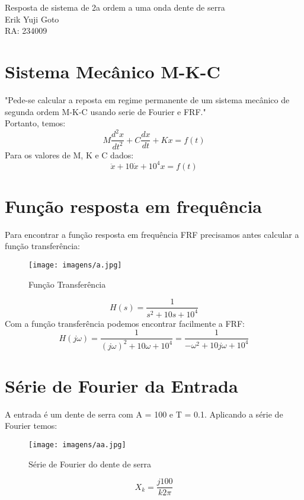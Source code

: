 \documentclass[a4paper, 12pt]{article}
\begin{document}
	\begin{center} %
		{\Large Resposta de sistema de 2a ordem a uma onda dente de serra}\\[0.4cm]
		{\large Erik Yuji Goto}\\[0.2cm]
		{\normalsize RA: 234009}
	\end{center} %

\section{Sistema Mecânico M-K-C}
"Pede-se calcular a reposta em regime permanente de um sistema mecânico de segunda ordem M-K-C usando serie de Fourier e FRF."\\
Portanto, temos:
	\begin{equation}
		M\frac{d^2x}{dt^2} + C\frac{dx}{dt} + Kx = f(t)
	\end{equation}
Para os valores de M, K e C dados:
	\begin{equation}
		\ddot{x} + 10\dot{x} + 10^4x = f(t)
	\end{equation}

\section{Função resposta em frequência}
	Para encontrar a função resposta em frequência FRF precisamos antes calcular a função transferência:
	\begin{figure}[h]
		\center
		\texttt{[image: imagens/a.jpg]}
		\caption{Função Transferência}
	\end{figure}
	\begin{equation}
		H(s) = \frac{1}{s^2+10s+10^4}
	\end{equation}
	Com a função transferência podemos encontrar facilmente a FRF:
	\begin{equation}
		H(j\omega) = \frac{1}{(j\omega)^2+10\omega+10^4} = \frac{1}{-\omega^2 + 10j\omega + 10^4}
	\end{equation}
	
\section{Série de Fourier da Entrada}
	A entrada é um dente de serra com A = 100 e T = 0.1. Aplicando a série de Fourier temos:
	\begin{figure}[h]
		\center
		\texttt{[image: imagens/aa.jpg]}
		\caption{Série de Fourier do dente de serra}
	\end{figure}
	\begin{equation}
		X_k = \frac{j100}{k2\pi}
	\end{equation}		
	
\end{document}
